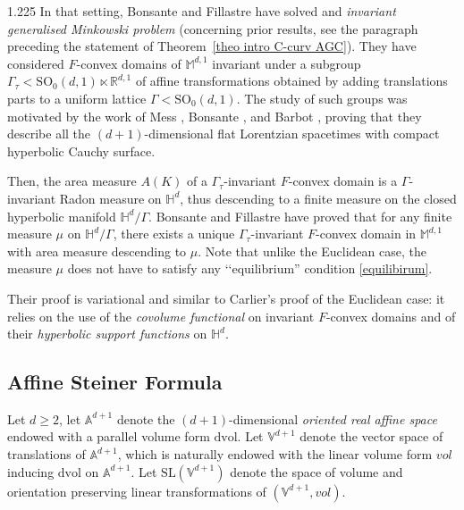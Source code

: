 \documentclass[reqno, a4paper]{amsart}
\numberwithin{equation}{section}
\numberwithin{figure}{section}
\theoremstyle{definition}
\theoremstyle{remark}
\newcommand{\R}{\mathbb{R}} %
\newcommand{\V}{\mathbb{V}} %
\newcommand{\A}{\mathbb{A}} %
\newcommand{\M}{\mathbb{M}} %
\renewcommand{\H}{\mathbb{H}} %
\newcommand{\SL}{\mathrm{SL}} %
\newcommand{\SO}{\mathrm{SO}} %
\newcommand{\dif}{\mathrm{d}} %
\newcommand{\linvol}{\mathit{vol}} %
\newcommand{\dvol}{\dif \mathrm{vol}} %
\begin{document}
\begin{spacing}{1.225}
In that setting, Bonsante and Fillastre \cite{Bonsante_Fillastre_17} have solved and \emph{invariant generalised Minkowski problem} (concerning prior results, see the paragraph preceding the statement of Theorem~\ref{theo intro C-curv AGC}). They have considered $F$-convex domains of $\M^{d,1}$ invariant under a subgroup $\Gamma_\tau < \SO_0(d,1) \ltimes \R^{d,1}$ of affine transformations obtained by adding translations parts to a uniform lattice $\Gamma < \SO_0(d,1)$. The study of such groups was motivated by the work of Mess \cite{Mess_07,Mess_notes}, Bonsante \cite{Bonsante_05}, and Barbot \cite{Barbot_05}, proving that they describe all the 
$(d+1)$-dimensional flat Lorentzian spacetimes with compact hyperbolic Cauchy surface.

 Then, the area measure $A(K)$ of a $\Gamma_\tau$-invariant $F$-convex domain is a $\Gamma$-invariant Radon measure on $\H^d$, thus descending to a finite measure on the closed hyperbolic manifold $\H^d/\Gamma$. Bonsante and Fillastre have proved that for any finite measure $\mu$ on $\H^d/\Gamma$, there exists a unique $\Gamma_\tau$-invariant $F$-convex domain in $\M^{d,1}$ with area measure descending to $\mu$. Note that unlike the Euclidean case, the measure $\mu$ does not have to satisfy any ‘‘equilibrium'' condition \eqref{equilibirum}.

Their proof is variational and similar to Carlier's proof of the Euclidean case:  it relies on the use of the \emph{covolume functional} on invariant $F$-convex domains and of their \emph{hyperbolic support functions} on $\H^d$. 

\subsection*{Affine Steiner Formula}

Let $d \geq 2$, let $\A^{d+1}$ denote the $(d+1)$-dimensional \emph{oriented real affine space} endowed with a parallel volume form $\dvol$. Let $\V^{d+1}$ denote the vector space of translations of $\A^{d+1}$, which is naturally endowed with the linear volume form $\linvol$ inducing $\dvol$ on $\A^{d+1}$. Let $\SL(\V^{d+1})$ denote the space of volume and orientation preserving linear transformations of $(\V^{d+1},\linvol)$.


\end{spacing}
\end{document}
